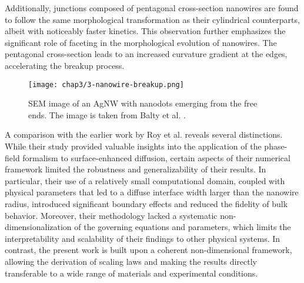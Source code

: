 Additionally, junctions composed of pentagonal cross-section nanowires are found to follow the same morphological transformation as their cylindrical counterparts, albeit with noticeably faster kinetics. This observation further emphasizes the significant role of faceting in the morphological evolution of nanowires. The pentagonal cross-section leads to an increased curvature gradient at the edges, accelerating the breakup process.
\begin{figure}[!htbp]
    \centering
    \texttt{[image: chap3/3-nanowire-breakup.png]}
    \caption{SEM image of an AgNW with nanodots emerging from the free ends. The image is taken from Balty et al. \cite{BaltyBaretSilhanekNguyen2024}.}
    \label{fig:3-sem-nanowire-breakup}
\end{figure}

A comparison with the earlier work by Roy et al. reveals several distinctions. While their study provided valuable insights into the application of the phase-field formalism to surface-enhanced diffusion, certain aspects of their numerical framework limited the robustness and generalizability of their results. In particular, their use of a relatively small computational domain, coupled with physical parameters that led to a diffuse interface width larger than the nanowire radius, introduced significant boundary effects and reduced the fidelity of bulk behavior. Moreover, their methodology lacked a systematic non-dimensionalization of the governing equations and parameters, which limits the interpretability and scalability of their findings to other physical systems. In contrast, the present work is built upon a coherent non-dimensional framework, allowing the derivation of scaling laws and making the results directly transferable to a wide range of materials and experimental conditions.


